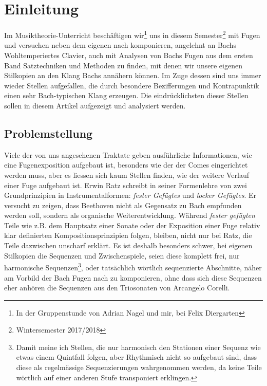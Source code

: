 \section{Einleitung}

Im Musiktheorie-Unterricht beschäftigen wir\footnote{In der Gruppenstunde von Adrian Nagel und mir, bei Felix Diergarten} uns in diesem Semester\footnote{Wintersemester 2017/2018} mit Fugen und versuchen neben dem eigenen nach komponieren, angelehnt an Bachs Wohltemperiertes Clavier, auch mit Analysen von Bachs Fugen aus dem ersten Band Satztechniken und Methoden zu finden, mit denen wir unsere eigenen Stilkopien an den Klang Bachs annähern können.
Im Zuge dessen sind uns immer wieder Stellen aufgefallen, die durch besondere Bezifferungen und Kontrapunktik einen sehr Bach-typischen Klang erzeugen.
Die eindrücklichsten dieser Stellen sollen in diesem Artikel aufgezeigt und analysiert werden.


\subsection{Problemstellung}

Viele der von uns angesehenen Traktate geben ausführliche Informationen, wie eine Fugenexposition aufgebaut ist, besonders wie der der Comes eingerichtet werden muss, aber es liessen sich kaum Stellen finden, wie der weitere Verlauf einer Fuge aufgebaut ist.
Erwin Ratz schreibt in seiner Formenlehre\autocite[21]{ratz:formenlehre} von zwei Grundprinzipien in Instrumentalformen: \emph{fester Gefügtes} und \emph{locker Gefügtes}.
Er versucht zu zeigen, dass Beethoven nicht als Gegensatz zu Bach empfunden werden soll, sondern als organische Weiterentwicklung.
Während \emph{fester gefügten} Teile wie z.B. dem Hauptsatz einer Sonate oder der Exposition einer Fuge relativ klar definierten Kompositionsprinzipien folgen, bleiben, nicht nur bei Ratz, die Teile dazwischen unscharf erklärt.
Es ist deshalb besonders schwer, bei eigenen Stilkopien die Sequenzen und Zwischenspiele, seien diese komplett frei, nur harmonische Sequenzen\footnote{Damit meine ich Stellen, die nur harmonisch den Stationen einer Sequenz wie etwas einem Quintfall folgen, aber Rhythmisch nicht so aufgebaut sind, dass diese als regelmässige Sequenzierungen wahrgenommen werden, da keine Teile wörtlich auf einer anderen Stufe transponiert erklingen.}, oder tatsächlich wörtlich sequenzierte Abschnitte, näher am Vorbild der Bach Fugen nach zu komponieren, ohne dass sich diese Sequenzen eher anhören die Sequenzen aus den Triosonaten von Arcangelo Corelli.


